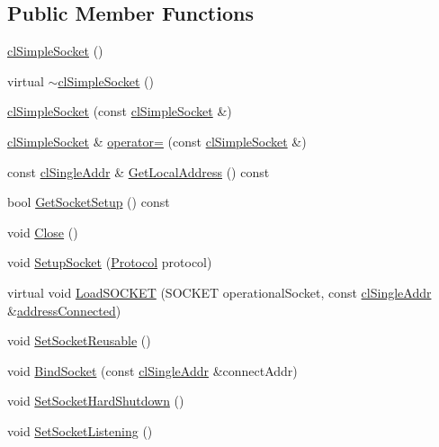 \subsection*{Public Member Functions}
\begin{DoxyCompactItemize}
\item 
\hyperlink{classcl_simple_socket_a383b01774d258fc6683dcf2a7839178c}{clSimpleSocket} ()
\item 
virtual \hyperlink{classcl_simple_socket_a14d5eac79430765b246872ef7eaa4877}{$\sim$clSimpleSocket} ()
\item 
\hyperlink{classcl_simple_socket_a60492de2aff7cf5a12206508be995151}{clSimpleSocket} (const \hyperlink{classcl_simple_socket}{clSimpleSocket} \&)
\item 
\hyperlink{classcl_simple_socket}{clSimpleSocket} \& \hyperlink{classcl_simple_socket_ad417a697e347483ec324ae5724d0c718}{operator=} (const \hyperlink{classcl_simple_socket}{clSimpleSocket} \&)
\item 
const \hyperlink{classcl_single_addr}{clSingleAddr} \& \hyperlink{classcl_simple_socket_a0fcc08cbc2db5c6e6a9f8118133504a1}{GetLocalAddress} () const 
\item 
bool \hyperlink{classcl_simple_socket_a469aff1fe89408403eff0ba14d1c6280}{GetSocketSetup} () const 
\item 
void \hyperlink{classcl_simple_socket_a755206da4d4b36d15353949c9a248398}{Close} ()
\item 
void \hyperlink{classcl_simple_socket_ab6848c5add8c92fd54ac2e297f2fbe1a}{SetupSocket} (\hyperlink{classcl_simple_socket_affcd3d22c1abba5d20a0ae93472c576d}{Protocol} protocol)
\item 
virtual void \hyperlink{classcl_simple_socket_a3d1e886eb5fe1ed25f35ff4c5cad546e}{LoadSOCKET} (SOCKET operationalSocket, const \hyperlink{classcl_single_addr}{clSingleAddr} \&\hyperlink{classcl_simple_socket_ae777e37939afd56e6bde9c3513ad7b75}{addressConnected})
\item 
void \hyperlink{classcl_simple_socket_a3972dd47ba94afc25966943f9979f405}{SetSocketReusable} ()
\item 
void \hyperlink{classcl_simple_socket_ad73dc4363a41d18199ef8203d86667bc}{BindSocket} (const \hyperlink{classcl_single_addr}{clSingleAddr} \&connectAddr)
\item 
void \hyperlink{classcl_simple_socket_ac5260767d6b1abce845199e7698092a2}{SetSocketHardShutdown} ()
\item 
void \hyperlink{classcl_simple_socket_a74328f22dfbad56fff2c85f074e691b3}{SetSocketListening} ()

\end{DoxyCompactItemize}
